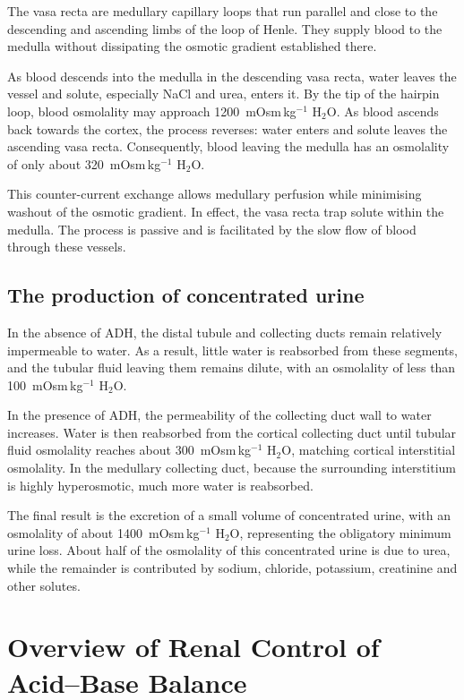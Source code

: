 \documentclass[11pt,a4paper]{article}
\begin{document}
The vasa recta are medullary capillary loops that run parallel and close to the descending and ascending limbs of the loop of Henle. They supply blood to the medulla without dissipating the osmotic gradient established there.

As blood descends into the medulla in the descending vasa recta, water leaves the vessel and solute, especially NaCl and urea, enters it. By the tip of the hairpin loop, blood osmolality may approach 1200~mOsm\,kg$^{-1}$ H$_2$O. As blood ascends back towards the cortex, the process reverses: water enters and solute leaves the ascending vasa recta. Consequently, blood leaving the medulla has an osmolality of only about 320~mOsm\,kg$^{-1}$ H$_2$O.

This counter-current exchange allows medullary perfusion while minimising washout of the osmotic gradient. In effect, the vasa recta trap solute within the medulla. The process is passive and is facilitated by the slow flow of blood through these vessels.

\subsection{The production of concentrated urine}

In the absence of ADH, the distal tubule and collecting ducts remain relatively impermeable to water. As a result, little water is reabsorbed from these segments, and the tubular fluid leaving them remains dilute, with an osmolality of less than 100~mOsm\,kg$^{-1}$ H$_2$O.

In the presence of ADH, the permeability of the collecting duct wall to water increases. Water is then reabsorbed from the cortical collecting duct until tubular fluid osmolality reaches about 300~mOsm\,kg$^{-1}$ H$_2$O, matching cortical interstitial osmolality. In the medullary collecting duct, because the surrounding interstitium is highly hyperosmotic, much more water is reabsorbed.

The final result is the excretion of a small volume of concentrated urine, with an osmolality of about 1400~mOsm\,kg$^{-1}$ H$_2$O, representing the obligatory minimum urine loss. About half of the osmolality of this concentrated urine is due to urea, while the remainder is contributed by sodium, chloride, potassium, creatinine and other solutes.


\section{Overview of Renal Control of Acid--Base Balance}
\end{document}
